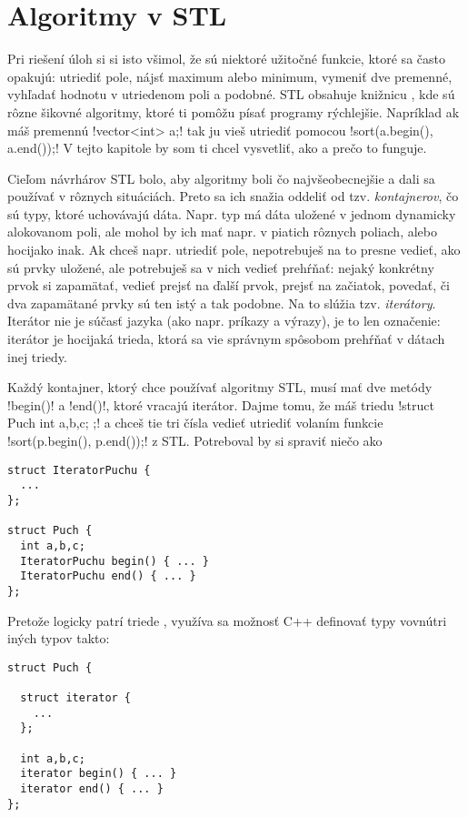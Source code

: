 \chapter{Algoritmy v STL}
\label{sect:algstl}

Pri riešení úloh si si isto všimol, že sú niektoré užitočné funkcie, ktoré sa
často opakujú: utriediť pole, nájsť maximum alebo minimum, vymeniť dve premenné,
vyhľadať hodnotu v utriedenom poli a podobné. STL obsahuje knižnicu ,
kde sú rôzne šikovné algoritmy, ktoré ti pomôžu písať programy rýchlejšie. Napríklad
ak máš premennú \prg!vector<int> a;! tak ju vieš utriediť pomocou
\prg!sort(a.begin(), a.end());! V tejto kapitole by som ti chcel vysvetliť, ako 
a prečo to 
funguje.

 Cieľom návrhárov STL bolo, aby algoritmy boli čo najvšeobecnejšie a dali 
sa používať v rôznych situáciách. Preto sa ich snažia oddeliť od tzv. {\em kontajnerov},
čo sú typy, ktoré uchovávajú dáta.
Napr. typ 
má dáta uložené v jednom dynamicky alokovanom poli, ale mohol by ich mať napr. v piatich
rôznych poliach, alebo hocijako inak.
Ak chceš napr. utriediť
pole, nepotrebuješ na to presne vedieť, ako sú prvky uložené, ale potrebuješ sa v nich vedieť
prehŕňať: nejaký konkrétny prvok si zapamätať, vedieť prejsť na ďalší prvok, prejsť
na začiatok, povedať, či dva zapamätané prvky sú ten istý a tak podobne. 
Na to slúžia  tzv. {\em iterátory}. Iterátor nie je súčasť jazyka (ako 
napr. príkazy a výrazy), je to len označenie: iterátor je hocijaká trieda, ktorá sa
vie správnym spôsobom prehŕňať v dátach inej triedy.


Každý kontajner, ktorý chce používať algoritmy STL, musí mať dve metódy \prg!begin()!
a \prg!end()!, ktoré vracajú iterátor. Dajme tomu, že máš triedu 
\prg!struct Puch{ int a,b,c; };! a chceš tie tri čísla vedieť utriediť volaním funkcie
\prg!sort(p.begin(), p.end());! z STL. Potreboval by si spraviť niečo ako 

\begin{lstlisting}
struct IteratorPuchu {
  ...
};

struct Puch {
  int a,b,c;
  IteratorPuchu begin() { ... }
  IteratorPuchu end() { ... }
};
\end{lstlisting}

 Pretože  logicky patrí triede , využíva sa možnosť C++
definovať typy vovnútri iných typov takto:

\begin{lstlisting}
struct Puch {

  struct iterator {
    ...
  };

  int a,b,c;
  iterator begin() { ... }
  iterator end() { ... }
};
\end{lstlisting}

